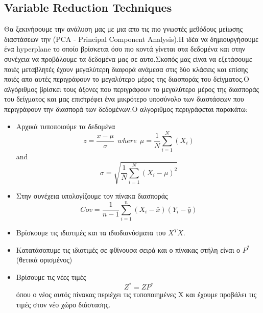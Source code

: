 \documentclass[12pt,a4paper]{article}
\begin{document}
\subsection{Variable Reduction Techniques}
Θα ξεκινήσουμε την ανάλυση μας με μια απο τις πιο γνωστές μεθόδους μείωσης διαστάσεων την (PCA - Principal Component Analysis).Η ιδέα να δημιουργήσουμε ένα hyperplane το οποίο βρίσκεται όσο πιο κοντά γίνεται στα δεδομένα και στην συνέχεια να προβάλουμε τα δεδομένα μας σε αυτο.Σκοπός μας είναι να εξετάσουμε ποιές μεταβλητές έχουν μεγαλύτερη διαφορά ανάμεσα στις δύο κλάσεις και επίσης ποιές απο αυτές περιγράφουν το μεγαλύτερο μέρος της διασποράς του δείγματος.Ο αλγόριθμος βρίσκει τους άξονες που περιγράφουν το μεγαλύτερο μέρος της διασποράς του δείγματος και μας επιστρέφει ένα μικρότερο υποσύνολο των διαστάσεων που περιγράφουν την διασπορά των δεδομένων.Ο αλγοριθμος περιγράφεται παρακάτω:
\begin{itemize}
\item Αρχικά τυποποιούμε τα δεδομένα
$$z = \frac{x-\mu}{\sigma} \ \  where  \ \ \mu = \frac{1}{N}\sum_{i=1}^N (X_i)$$
and $$\sigma = \sqrt{\frac{1}{N}\sum_{i=1}^N(X_i -\mu)^2 } $$
\item Στην συνέχεια υπολογίζουμε τον πίνακα διασποράς
$$Cov = \frac{1}{n-1} \sum_{i=1}^n (X_i-\bar{x})(Y_i - \bar{y})$$
\item Βρίσκουμε τις ιδιοτιμές και τα ιδιοδιανύσματα του $X^TX$.
\item Κατατάσοπυμε τις ιδιοτιμές σε φθίνουσα σειρά και ο πίνακας στήλη είναι ο $P^*$ (θετικά ορισμένος)
\item Βρίσουμε τις νέες τιμές
$$Z^* = ZP^*$$
όπου ο νέος αυτός πίνακας περιέχει τις τυποποιημένες X και έχουμε προβάλει τις τιμές στον νέο χώρο διάστασης.



\end{itemize}
\end{document}
